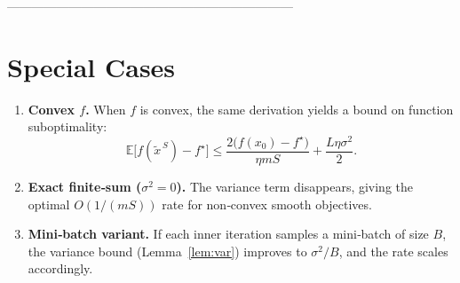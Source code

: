 \documentclass{article}
\newcommand{\E}{\mathbb{E}}
\begin{document}
---------------------------------------------------------------------

\section*{Special Cases}
\begin{enumerate}
    \item \textbf{Convex $f$.} When $f$ is convex, the same derivation yields a bound on function suboptimality:
    \[
    \E\!\bigl[f(\tilde{x}^{\,S})-f^\star\bigr]\le
    \frac{2\bigl(f(x_0)-f^\star\bigr)}{\eta m S}
    +\frac{L\eta\sigma^{2}}{2}.
    \]
    \item \textbf{Exact finite‑sum ($\sigma^{2}=0$).} The variance term disappears, giving the optimal $O(1/(mS))$ rate for non‑convex smooth objectives.
    \item \textbf{Mini‑batch variant.} If each inner iteration samples a mini‑batch of size $B$, the variance bound (Lemma~\ref{lem:var}) improves to $\sigma^{2}/B$, and the rate scales accordingly.
\end{enumerate}
\end{document}
